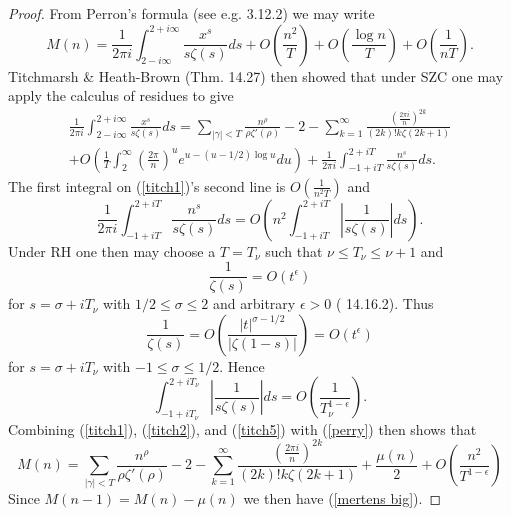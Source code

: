 \documentclass[11pt,article]{amsart}
\numberwithin{equation}{section}
\numberwithin{equation}{section}
\numberwithin{lemma}{section}
\numberwithin{prop}{section}
\begin{document}
\begin{proof}
From Perron's formula (see e.g. \cite{titchmarsh} 3.12.2) we may write 
\begin{equation}
M(n)=\frac{1}{2\pi i}\int_{2-i\infty}^{2+i\infty}\frac{x^{s}}{s\zeta(s)}ds+O\left(\frac{n^{2}}{T}\right)+O\left(\frac{\log n}{T}\right)+O\left(\frac{1}{nT}\right). \label{perry}
\end{equation}
Titchmarsh \& Heath-Brown \cite{titchmarsh} (Thm. 14.27) then showed that under SZC one may apply the calculus of residues to give
\begin{align}
\frac{1}{2\pi i}\int_{2-i\infty}^{2+i\infty}\frac{x^{s}}{s\zeta(s)}ds=\sum_{\left|\gamma\right|<T}\frac{n^{\rho}}{\rho\zeta'(\rho)}-2-\sum_{k=1}^{\infty}\frac{\left(\frac{2\pi i}{n}\right)^{2k}}{(2k)!k\zeta(2k+1)}\nonumber\\
+O\left(\frac{1}{T}\int_{2}^{\infty}\left(\frac{2\pi}{n}\right)^{u}e^{u-(u-1/2)\log u}du\right)+\frac{1}{2\pi i}\int_{-1+iT}^{2+iT}\frac{n^{s}}{s\zeta(s)}ds. \label{titch1}
\end{align}
The first integral on (\ref{titch1})'s second line is $O\left(\frac{1}{n^{2}T}\right)$ and
\begin{equation}
\frac{1}{2\pi i}\int_{-1+iT}^{2+iT}\frac{n^{s}}{s\zeta(s)}ds=O\left(n^{2}\int_{-1+iT}^{2+iT}\left|\frac{1}{s\zeta(s)}\right|ds\right). \label{titch2}
\end{equation}
Under RH one then may choose a $T=T_{\nu}$ such that $\nu \leq T_{\nu}\leq \nu+1$ and 
\begin{equation}
\frac{1}{\zeta(s)}=O\left(t^{\epsilon}\right) \label{titch3}
\end{equation}
for $s=\sigma+iT_{\nu}$ with $1/2\leq \sigma \leq 2$ and arbitrary $\epsilon>0$ (\cite{titchmarsh} 14.16.2). Thus
\begin{equation}
\frac{1}{\zeta(s)}=O\left(\frac{\left|t\right|^{\sigma-1/2}}{\left|\zeta(1-s)\right|}\right)=O\left(t^{\epsilon}\right) \label{titch4}
\end{equation}
for $s=\sigma+iT_{\nu}$ with $-1\leq \sigma \leq 1/2$. Hence 
\begin{equation}
\int_{-1+iT_{\nu}}^{2+iT_{\nu}}\left|\frac{1}{s\zeta(s)}\right|ds=O\left(\frac{1}{T_{\nu}^{1-\epsilon}}\right). \label{titch5}
\end{equation}
Combining (\ref{titch1}), (\ref{titch2}), and (\ref{titch5}) with (\ref{perry}) then shows that 
\begin{equation}
M(n)=\sum_{\left|\gamma\right|<T}\frac{n^{\rho}}{\rho\zeta'(\rho)}-2-\sum_{k=1}^{\infty}\frac{\left(\frac{2\pi i}{n}\right)^{2k}}{(2k)!k\zeta(2k+1)}+\frac{\mu(n)}{2}+O\left(\frac{n^{2}}{T^{1-\epsilon}}\right) \label{pre mertens big}
\end{equation}
Since $M(n-1)=M(n)-\mu(n)$ we then have (\ref{mertens big}).
\end{proof}
\end{document}
